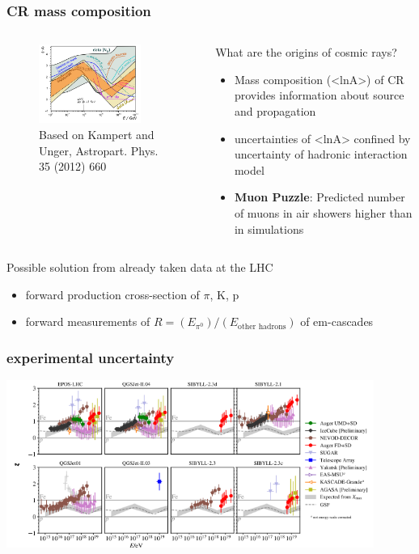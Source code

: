 \documentclass[aspectratio=1610, 9pt]{beamer}
\begin{document}
\begin{frame}\frametitle{CR mass composition}
  \begin{columns}
    \begin{column}[c]{0.48\textwidth}
      \begin{figure}
        \includegraphics[width=0.8\textwidth]{lnA_all.png}
        \caption{Based on Kampert and Unger, Astropart. Phys. 35 (2012) 660}
      \end{figure}
    \end{column}
    \begin{column}[c]{0.48\textwidth}
      What are the origins of cosmic rays?
      \begin{itemize}
        \item Mass composition (<lnA>) of CR provides information about source and propagation
        \item uncertainties of <lnA> confined by uncertainty of hadronic interaction model
        \item \textbf{Muon Puzzle}: Predicted number of muons in air showers higher than in simulations
      \end{itemize}
    \end{column}
  \end{columns}
  Possible solution from already taken data at the LHC
  \begin{itemize}
    \item forward production cross-section of $\pi$, K, p
    \item forward measurements of $R = (E_{\pi^0}) / (E_\text{other hadrons})$ of em-cascades
  \end{itemize}
\end{frame}

\begin{frame}\frametitle{experimental uncertainty}
  \includegraphics[width=0.9\textwidth]{unc.png}
\end{frame}
\end{document}
